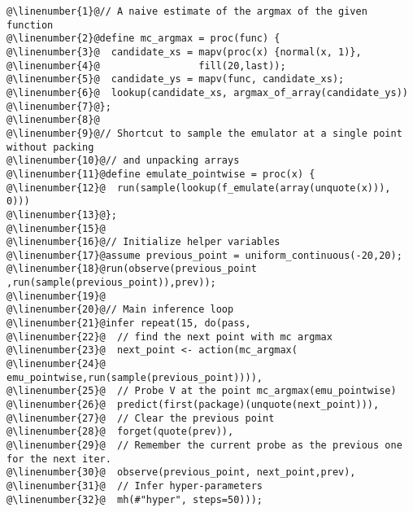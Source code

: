 \begin{mdframed}
\begin{minipage}{\linewidth}
\small
\belowcaptionskip=-10pt
\begin{lstlisting}[caption={Bayesian optimization with Gaussian drift
proposals},mathescape,numbers=none,label=alg:drift_bayesopt,escapechar=\@]
@\linenumber{1}@// A naive estimate of the argmax of the given function
@\linenumber{2}@define mc_argmax = proc(func) {
@\linenumber{3}@  candidate_xs = mapv(proc(x) {normal(x, 1)},
@\linenumber{4}@                 fill(20,last));
@\linenumber{5}@  candidate_ys = mapv(func, candidate_xs);
@\linenumber{6}@  lookup(candidate_xs, argmax_of_array(candidate_ys))
@\linenumber{7}@};
@\linenumber{8}@
@\linenumber{9}@// Shortcut to sample the emulator at a single point without packing
@\linenumber{10}@// and unpacking arrays
@\linenumber{11}@define emulate_pointwise = proc(x) {
@\linenumber{12}@  run(sample(lookup(f_emulate(array(unquote(x))), 0)))
@\linenumber{13}@};
@\linenumber{15}@
@\linenumber{16}@// Initialize helper variables
@\linenumber{17}@assume previous_point = uniform_continuous(-20,20);
@\linenumber{18}@run(observe(previous_point ,run(sample(previous_point)),prev));
@\linenumber{19}@
@\linenumber{20}@// Main inference loop
@\linenumber{21}@infer repeat(15, do(pass,
@\linenumber{22}@  // find the next point with mc argmax
@\linenumber{23}@  next_point <- action(mc_argmax(
@\linenumber{24}@		        emu_pointwise,run(sample(previous_point)))),
@\linenumber{25}@  // Probe V at the point mc_argmax(emu_pointwise)
@\linenumber{26}@  predict(first(package)(unquote(next_point))),
@\linenumber{27}@  // Clear the previous point
@\linenumber{28}@  forget(quote(prev)),
@\linenumber{29}@  // Remember the current probe as the previous one for the next iter.
@\linenumber{30}@  observe(previous_point, next_point,prev),
@\linenumber{31}@  // Infer hyper-parameters
@\linenumber{32}@  mh(#"hyper", steps=50)));
\end{lstlisting}

\end{minipage}
\end{mdframed}
